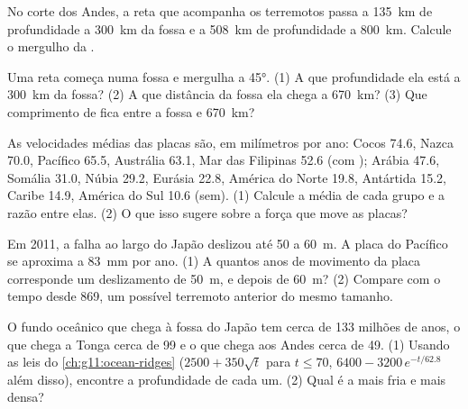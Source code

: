 \begin{exercise}[$\star\star$]\label{exo:g11:subduction-zones:6}
No corte dos Andes, a reta que acompanha os terremotos passa a
\qty{135}{km} de profundidade a \qty{300}{km} da fossa e a \qty{508}{km} de
profundidade a \qty{800}{km}. Calcule o mergulho da .
\end{exercise}

\begin{exercise}[$\star\star$]\label{exo:g11:subduction-zones:7}
Uma  reta começa numa fossa e mergulha a \ang{45}. (1) A que
profundidade ela está a \qty{300}{km} da fossa? (2) A que distância da fossa
ela chega a \qty{670}{km}? (3) Que comprimento de  fica entre a fossa e
\qty{670}{km}?
\end{exercise}

\begin{exercise}[$\star\star$]\label{exo:g11:subduction-zones:8}
As velocidades médias das placas são, em milímetros por ano: Cocos 74.6,
Nazca 70.0, Pacífico 65.5, Austrália 63.1, Mar das Filipinas 52.6 (com
); Arábia 47.6, Somália 31.0, Núbia 29.2, Eurásia 22.8, América do Norte
19.8, Antártida 15.2, Caribe 14.9, América do Sul 10.6 (sem). (1) Calcule a
média de cada grupo e a razão entre elas. (2) O que isso sugere sobre a
força que move as placas?
\end{exercise}

\begin{exercise}[$\star\star$]\label{exo:g11:subduction-zones:9}
Em 2011, a falha ao largo do Japão deslizou até 50 a \qty{60}{m}. A placa do
Pacífico se aproxima a \qty{83}{mm} por ano. (1) A quantos anos de movimento
da placa corresponde um deslizamento de \qty{50}{m}, e depois de
\qty{60}{m}? (2) Compare com o tempo desde 869, um possível terremoto
anterior do mesmo tamanho.
\end{exercise}

\begin{exercise}[$\star\star$]\label{exo:g11:subduction-zones:10}
O fundo oceânico que chega à fossa do Japão tem cerca de 133 milhões de
anos, o que chega a Tonga cerca de 99 e o que chega aos Andes cerca de 49.
(1) Usando as leis do \cref{ch:g11:ocean-ridges} ($2500 + 350\sqrt{t}$ para
$t \le 70$, $6400 - 3200\,e^{-t/62.8}$ além disso), encontre a profundidade de
cada um. (2) Qual é a  mais fria e mais densa?
\end{exercise}

